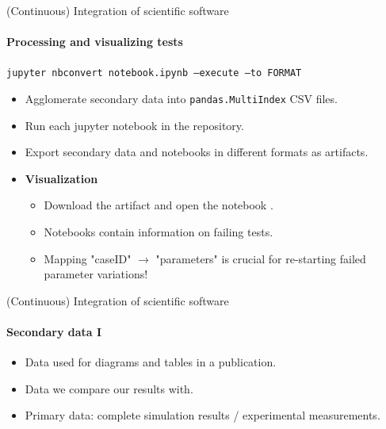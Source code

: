 \begin{frame}{(Continuous) Integration of scientific software} 
\framesubtitle{Processing and visualizing tests}
\vfill

    \vfill

    \texttt{jupyter nbconvert notebook.ipynb --execute --to FORMAT}

    \medskip

    \begin{itemize}
        \item Agglomerate secondary data into \texttt{pandas.MultiIndex} CSV files. 
        \item Run each jupyter notebook in the repository.
        \item Export secondary data and notebooks in different formats as artifacts.
        \item \textbf{Visualization} 
            \begin{itemize}
                \item Download the artifact and open the notebook \faGraduationCap.
                \item Notebooks contain information on failing tests. 
                \item Mapping "caseID" $\to$ "parameters" is crucial for re-starting failed parameter variations! 
            \end{itemize}
    \end{itemize}

\end{frame}

\begin{frame}{(Continuous) Integration of scientific software} 
\framesubtitle{Secondary data I}
\vfill

    \begin{itemize}
        \item Data used for diagrams and tables in a publication.
        \item Data we compare our results with.
        \item Primary data: complete simulation results / experimental measurements.
    \end{itemize}

\end{frame}

